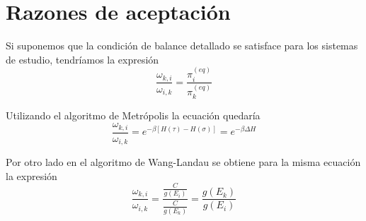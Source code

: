 \documentclass[12pt]{book}
\begin{document}
\section{Razones de aceptación}
Si suponemos que la condición de balance detallado se satisface para los sistemas de estudio, tendríamos la expresión
\begin{equation}
\frac{\omega_{k,i}}{\omega_{i,k}}=\frac{\pi_{i}^{(eq)}}{\pi_{k}^{(eq)}}
\end{equation}

Utilizando el algoritmo de Metrópolis la ecuación quedaría
\begin{equation}
\frac{\omega_{k,i}}{\omega_{i,k}}=e^{-\beta \left[ H (\tau)-H(\sigma)\right]}=e^{-\beta \Delta H}
\end{equation}

Por otro lado en el algoritmo de Wang-Landau se obtiene para la misma ecuación la expresión
\begin{equation}
\frac{\omega_{k,i}}{\omega_{i,k}}=\frac{\frac{C}{g(E_{i})}}{\frac{C}{g(E_{k})}}=\frac{g(E_{k})}{g(E_{i})}
\end{equation}
\end{document}
